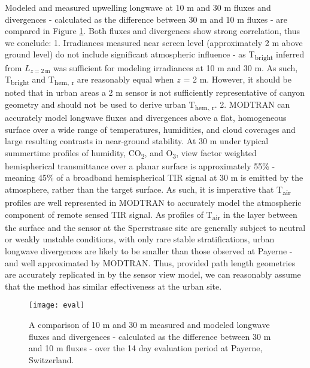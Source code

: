 \begin{bibunit}
Modeled and measured upwelling longwave at 10 \si{m} and 30 \si{m} fluxes and divergences - calculated as the difference between 30 \si{\meter} and 10 \si{\meter} fluxes - are compared in Figure \ref{fluxes}. Both fluxes and divergences show strong correlation, thus we conclude: 1. Irradiances measured near screen level (approximately 2 \si{\meter} above ground level) do not include significant atmospheric influence - as T\textsubscript{bright} inferred from $L_{z=2~\si{\meter}}$ was sufficient for modeling irradiances at 10 \si{m} and 30 \si{m}. As such, T\textsubscript{bright} and T\textsubscript{hem, r} are reasonably equal when $z$ = 2 \si{m}. However, it should be noted that in urban areas a 2 \si{m} sensor is not sufficiently representative of canyon geometry and should not be used to derive urban T\textsubscript{hem, r}. 2. MODTRAN can accurately model longwave fluxes and divergences above a flat, homogeneous surface over a wide range of temperatures, humidities, and cloud coverages and large resulting contrasts in near-ground stability. At 30 \si{\meter} under typical summertime profiles of humidity, CO\textsubscript{2}, and O\textsubscript{3}, view factor weighted hemispherical transmittance over a planar surface is approximately 55\% - meaning 45\% of a broadband hemispherical TIR signal at 30 \si{\meter} is emitted by the atmosphere, rather than the target surface. As such, it is imperative that T\textsubscript{air} profiles are well represented in MODTRAN to accurately model the atmospheric component of remote sensed TIR signal. As profiles of T\textsubscript{air} in the layer between the surface and the sensor at the Sperrstrasse site are generally subject to neutral or weakly unstable conditions, with only rare stable stratifications, urban longwave divergences are likely to be smaller than those observed at Payerne - and well approximated by MODTRAN. Thus, provided path length geometries are accurately replicated in by the sensor view model, we can reasonably assume that the method has similar effectiveness at the urban site.

\begin{figure}[H]
	\centering
	\texttt{[image: eval]}
	\caption{A comparison of 10 \si{m} and 30 \si{m} measured and modeled longwave fluxes and divergences - calculated as the difference between 30 \si{\meter} and 10 \si{\meter} fluxes - over the 14 day evaluation period at Payerne, Switzerland.}
	\label{fluxes}
\end{figure}


\end{bibunit}
